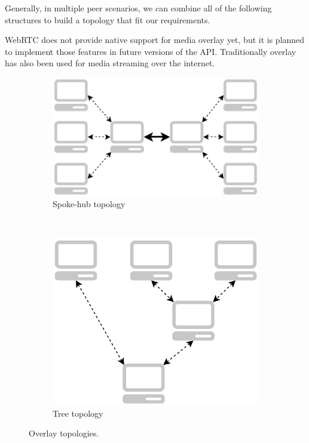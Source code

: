 Generally, in multiple peer scenarios, we can combine all of the following structures to build a topology that fit our requirements.

WebRTC does not provide native support for media overlay yet, but it is planned to implement those features in future versions of the API. Traditionally overlay has also been used for media streaming over the internet.

\begin{figure}[h]
        \centering
        \begin{subfigure}[b]{0.5\textwidth}
                \centering
                \includegraphics[width=\textwidth]{./figures/hubandspoke.pdf}
                \caption{Spoke-hub topology}
                \label{fig:hubandspoke}
        \end{subfigure}%
        ~ %
        \begin{subfigure}[b]{0.5\textwidth}
                \centering
                \includegraphics[width=\textwidth]{./figures/three.pdf}
                \caption{Tree topology}
                \label{fig:three}
        \end{subfigure}
        \caption[Overlay topologies]{Overlay topologies.}
        \label{fig:overlaytopologies}
\end{figure}

